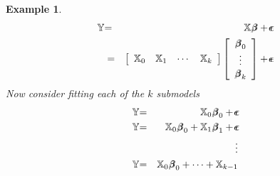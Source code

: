 \documentclass{article}
\newtheorem{example}[theorem]{Example}
\begin{document}
\bigskip

\begin{example}
\begin{eqnarray*}
\mathbb{Y} &\mathbb{=}&\mathbb{X}%
\beta\mkern-9.6mu \beta%
+%
\epsilon\mkern-10mu \epsilon
\\
&=&\left[ 
\begin{array}{cccc}
\mathbb{X}_{0} & \mathbb{X}_{1} & \cdots  & \mathbb{X}_{k}%
\end{array}%
\right] \left[ 
\begin{array}{c}
\beta\mkern-9.6mu \beta%
_{0} \\ 
\vdots  \\ 
\beta\mkern-9.6mu \beta%
_{k}%
\end{array}%
\right] +%
\epsilon\mkern-10mu \epsilon%
\end{eqnarray*}%
\newline
Now consider fitting each of the $k$ submodels%
\begin{eqnarray*}
\mathbb{Y} &\mathbb{=}&\mathbb{X}_{0}%
\beta\mkern-9.6mu \beta%
_{0}+%
\epsilon\mkern-10mu \epsilon
\\
\mathbb{Y} &\mathbb{=}&\mathbb{X}_{0}%
\beta\mkern-9.6mu \beta%
_{0}+\mathbb{X}_{1}%
\beta\mkern-9.6mu \beta%
_{1}+%
\epsilon\mkern-10mu \epsilon
\\
&&\vdots  \\
\mathbb{Y} &\mathbb{=}&\mathbb{X}_{0}%
\beta\mkern-9.6mu \beta%
_{0}+\cdots +\mathbb{X}_{k-1}%

\end{eqnarray*}
\end{example}
\end{document}
